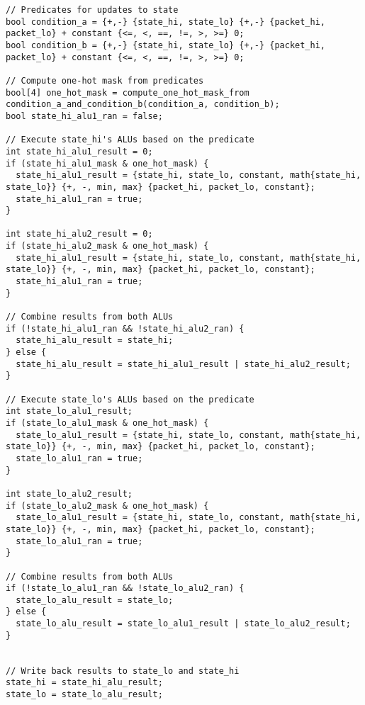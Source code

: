 \begin{tiny}
\begin{verbatim}
// Predicates for updates to state
bool condition_a = {+,-} {state_hi, state_lo} {+,-} {packet_hi, packet_lo} + constant {<=, <, ==, !=, >, >=} 0;
bool condition_b = {+,-} {state_hi, state_lo} {+,-} {packet_hi, packet_lo} + constant {<=, <, ==, !=, >, >=} 0;

// Compute one-hot mask from predicates
bool[4] one_hot_mask = compute_one_hot_mask_from condition_a_and_condition_b(condition_a, condition_b);
bool state_hi_alu1_ran = false;

// Execute state_hi's ALUs based on the predicate
int state_hi_alu1_result = 0;
if (state_hi_alu1_mask & one_hot_mask) {
  state_hi_alu1_result = {state_hi, state_lo, constant, math{state_hi, state_lo}} {+, -, min, max} {packet_hi, packet_lo, constant};
  state_hi_alu1_ran = true;
}

int state_hi_alu2_result = 0;
if (state_hi_alu2_mask & one_hot_mask) {
  state_hi_alu1_result = {state_hi, state_lo, constant, math{state_hi, state_lo}} {+, -, min, max} {packet_hi, packet_lo, constant};
  state_hi_alu1_ran = true;
}

// Combine results from both ALUs
if (!state_hi_alu1_ran && !state_hi_alu2_ran) {
  state_hi_alu_result = state_hi;
} else {
  state_hi_alu_result = state_hi_alu1_result | state_hi_alu2_result;
}

// Execute state_lo's ALUs based on the predicate
int state_lo_alu1_result;
if (state_lo_alu1_mask & one_hot_mask) {
  state_lo_alu1_result = {state_hi, state_lo, constant, math{state_hi, state_lo}} {+, -, min, max} {packet_hi, packet_lo, constant};
  state_lo_alu1_ran = true;
}

int state_lo_alu2_result;
if (state_lo_alu2_mask & one_hot_mask) {
  state_lo_alu1_result = {state_hi, state_lo, constant, math{state_hi, state_lo}} {+, -, min, max} {packet_hi, packet_lo, constant};
  state_lo_alu1_ran = true;
}

// Combine results from both ALUs
if (!state_lo_alu1_ran && !state_lo_alu2_ran) {
  state_lo_alu_result = state_lo;
} else {
  state_lo_alu_result = state_lo_alu1_result | state_lo_alu2_result;
}


// Write back results to state_lo and state_hi
state_hi = state_hi_alu_result;
state_lo = state_lo_alu_result;

\end{verbatim}
\end{tiny}
